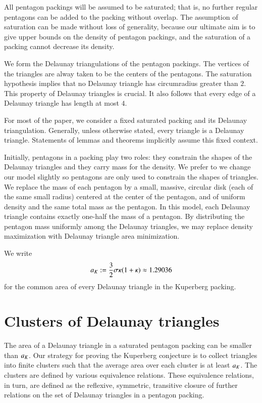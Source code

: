 All pentagon packings will be assumed to be saturated; that is, no
further regular pentagons can be added to the packing without overlap.
The assumption of saturation can be made without loss of generality,
because our ultimate aim is to give upper bounds on the density of
pentagon packings, and the saturation of a packing cannot decrease its
density.

We form the Delaunay triangulations of the pentagon packings.  The
vertices of the triangles are alway taken to be the centers of the
pentagons.  The saturation hypothesis implies that no Delaunay
triangle has circumradius greater than $2$.  This property of Delaunay
triangles is crucial.  It also follows that every edge of a Delaunay
triangle has length at most $4$.

For most of the paper, we consider a fixed saturated packing and its
Delaunay triangulation.  Generally, unless otherwise stated,
every triangle is a  Delaunay triangle.
Statements of lemmas and theorems implicitly
assume this fixed context.

Initially, pentagons in a packing play two roles: they constrain the
shapes of the Delaunay triangles and they carry mass for the density.
We prefer to we change our model slightly so pentagons are only used
to constrain the shapes of triangles.  We replace the mass of each
pentagon by a small, massive, circular disk (each of the same small
radius) centered at the center of the pentagon, and of uniform density
and the same total mass as the pentagon.  In this model, each Delaunay
triangle contains exactly one-half the mass of a pentagon.  By
distributing the pentagon mass uniformly among the Delaunay triangles,
we may replace density maximization with Delaunay triangle area
minimization.

We write 
\[
a_K := \frac{3}{2}{ \sigma \kappa(1+\kappa)} \approx 1.29036
\] %
for the common area of every Delaunay triangle in the 
Kuperberg packing.  

\section{Clusters of Delaunay triangles}

The area of a Delaunay triangle in a saturated pentagon packing can be
smaller than $a_K$.  Our strategy for proving the Kuperberg conjecture
is to collect triangles into finite clusters such that the average
area over each cluster is at least $a_K$.  The clusters are defined by
various equivalence relations.  These equivalence relations, in turn,
are defined as the reflexive, symmetric, transitive closure of further
relations on the set of Delaunay triangles in a pentagon packing.

